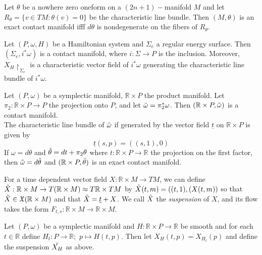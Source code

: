 \begin{prop}
Let $\theta$ be a nowhere zero oneform on a $(2n+1)-$manifold $M$ and let $R_\theta=\{v \in TM: \theta(v)=0\}$ be the characteristic line bundle. Then $(M, \theta)$ is an exact contact manifold ifff $d\theta$ is nondegenerate on the fibers of $R_\theta$.
\end{prop}

\begin{prop}
Let $(P,\omega,H)$ be a Hamiltonian system and $\Sigma_e$ a regular energy surface. Then $(\Sigma_e, i^*\omega)$ is a contact manifold, where $i: \Sigma \to P$ is the inclusion. Moreover, $X_H \restriction_{\Sigma_e}$ is a characteristic vector field of $i^*\omega$ generating the characteristic line bundle of $i^*\omega$.
\end{prop}

\begin{prop}

Let $(P,\omega)$ be a symplectic manifold, $\mathbb{R} \times P$ the product manifold. Let $\pi_2: \mathbb{R} \times P \to P$ the projection onto $P$, and let $\Tilde{\omega} = \pi_2^*\omega$. Then $(\mathbb{R} \times P, \Tilde{\omega})$ is a contact manifold. \\
\indent The characteristic line bundle of $\Tilde{\omega}$ if generated by the vector field $\underline{t}$ on $\mathbb{R} \times P$ is given by
\[\underline{t}(s,p) = \left( (s,1),0 \right)\]
If $\omega = d \theta$ and $\Tilde{\theta}=dt+\pi_2 \theta$ where $t: \mathbb{R} \times P \to \mathbb{R}$ the projection on the first factor, then $\Tilde{\omega} = d \Tilde{\theta}$ and $(\mathbb{R} \times P, \Tilde{\theta})$ is an exact contact manifold.
\end{prop}

For a time dependent vector field $X: \mathbb{R} \times M \to TM$, we can define $\Tilde{X}: \mathbb{R} \times M \to T(\mathbb{R} \times M) \approx T\mathbb{R} \times TM$ by $\Tilde{X}(t,m) = ((t,1),(X(t,m))$ so that $\Tilde{X} \in \mathfrak{X}(\mathbb{R} \times M)$ and that $\Tilde{X}= \underline{t}+X$. We call $\Tilde{X}$ the \textit{suspension} of $X$, and its flow takes the form $F_{t,s}:\mathbb{R}\times M \to \mathbb{R} \times M$.

\begin{defn}
Let $(P,\omega)$ be a symplectic manifold and $H: \mathbb{R} \times P \to \mathbb{R}$ be smooth and for each $t \in \mathbb{R}$ define $H_t: P \to \mathbb{R}; \hspace{4pt} p \mapsto H(t,p)$. Then let $X_H(t,p) = X_{H_t}(p)$ and define the suspension $\Tilde{X_H}$ as above.
\end{defn}

